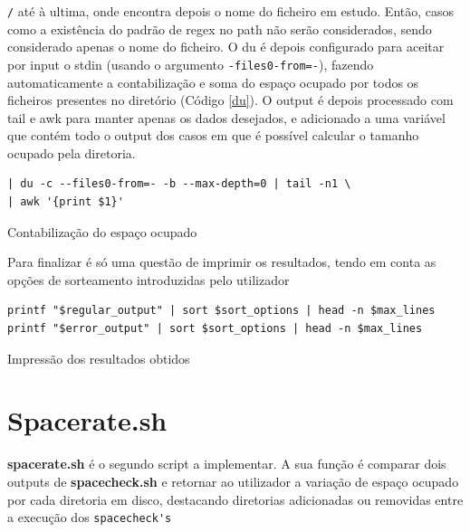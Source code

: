 \verb|/| até à ultima, onde encontra depois o nome do
ficheiro em estudo. Então, casos como a existência do padrão
de regex no path não serão considerados, sendo considerado
apenas o nome do ficheiro.
O du é depois configurado para aceitar por input o stdin
(usando o argumento \verb|-files0-from=-|), fazendo
automaticamente a contabilização e soma do espaço ocupado
por todos os ficheiros presentes no diretório (Código \ref{du}). O output é
depois processado com tail e awk para manter apenas os dados
desejados, e adicionado a uma variável que contém todo o
output dos casos em que é possível calcular o tamanho
ocupado pela diretoria.
\begin{listing}[H]
\begin{verbatim}
| du -c --files0-from=- -b --max-depth=0 | tail -n1 \ 
| awk '{print $1}'
\end{verbatim}
\caption{Contabilização do espaço ocupado}
\label{du}
\end{listing}
Para finalizar é só uma questão de imprimir os resultados,
tendo em conta as opções de sorteamento introduzidas pelo
utilizador
\begin{listing}[H]
\begin{verbatim}
printf "$regular_output" | sort $sort_options | head -n $max_lines
printf "$error_output" | sort $sort_options | head -n $max_lines
\end{verbatim}
\caption{Impressão dos resultados obtidos}
\end{listing}

\section{Spacerate.sh}
\textbf{spacerate.sh} é o segundo script a implementar. A
sua função é comparar dois outputs de \textbf{spacecheck.sh}
e retornar ao utilizador a variação de espaço ocupado por
cada diretoria em disco, destacando diretorias adicionadas
ou removidas entre a execução dos \verb|spacecheck's|
